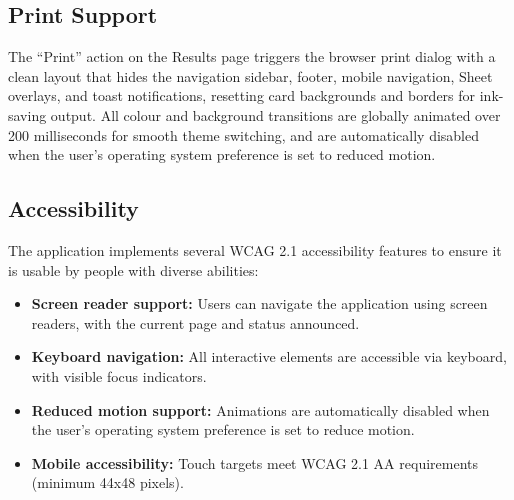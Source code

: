 \subsection{Print Support}

The ``Print'' action on the Results page triggers the browser print dialog with a clean layout that hides the navigation sidebar, footer, mobile navigation, Sheet overlays, and toast notifications, resetting card backgrounds and borders for ink-saving output. All colour and background transitions are globally animated over 200 milliseconds for smooth theme switching, and are automatically disabled when the user's operating system preference is set to reduced motion.

\subsection{Accessibility}

The application implements several WCAG 2.1 accessibility features to ensure it is usable by people with diverse abilities:
\begin{itemize}
\item \textbf{Screen reader support:} Users can navigate the application using screen readers, with the current page and status announced.
\item \textbf{Keyboard navigation:} All interactive elements are accessible via keyboard, with visible focus indicators.
\item \textbf{Reduced motion support:} Animations are automatically disabled when the user's operating system preference is set to reduce motion.
\item \textbf{Mobile accessibility:} Touch targets meet WCAG 2.1 AA requirements (minimum 44x48 pixels).
\end{itemize}
